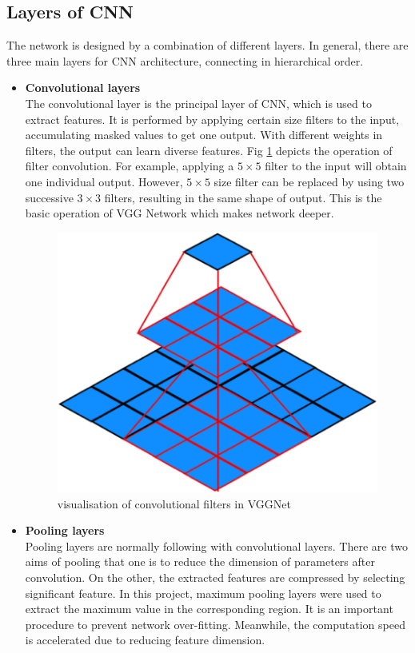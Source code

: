 \subsection{Layers of CNN}
The network is designed by a combination of different layers. In general, there are three main layers for CNN architecture, connecting in hierarchical order.
\begin{itemize}[leftmargin=*]
	\item\textbf{Convolutional layers}\\
	The convolutional layer is the principal layer of CNN, which is used to extract features. It is performed by applying certain size filters to the input, accumulating masked values to get one output. With different weights in filters, the output can learn diverse features. Fig \ref{fig:filter} depicts the operation of filter convolution. For example, applying a $5\times5$ filter to the input will obtain one individual output. However, $5\times5$ size filter can be replaced by using two successive $3\times3$ filters, resulting in the same shape of output. This is the basic operation of VGG Network which makes network deeper.
	\begin{figure}[htp]
	\centering
	  \includegraphics[scale=0.5]{Figs/chap3/vggfilter.png}
	  \caption{visualisation of convolutional filters in VGGNet}
	 \label{fig:filter}
	\end{figure}
	\item\textbf{Pooling layers}\\
	Pooling layers are normally following with convolutional layers. There are two aims of pooling that one is to reduce the dimension of parameters after convolution. On the other, the extracted features are compressed by selecting significant feature. In this project, maximum pooling layers were used to extract the maximum value in the corresponding region. It is an important procedure to prevent network over-fitting. Meanwhile, the computation speed is accelerated due to reducing feature dimension.

\end{itemize}
